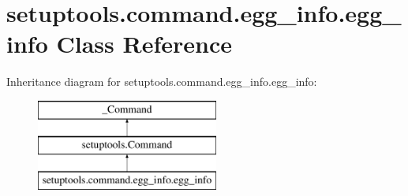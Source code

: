 \hypertarget{classsetuptools_1_1command_1_1egg__info_1_1egg__info}{}\section{setuptools.\+command.\+egg\+\_\+info.\+egg\+\_\+info Class Reference}
\label{classsetuptools_1_1command_1_1egg__info_1_1egg__info}
Inheritance diagram for setuptools.\+command.\+egg\+\_\+info.\+egg\+\_\+info\+:\begin{figure}[H]
\begin{center}
\leavevmode
\includegraphics[height=3.000000cm]{classsetuptools_1_1command_1_1egg__info_1_1egg__info}
\end{center}
\end{figure}
